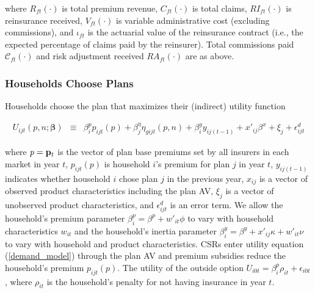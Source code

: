 \documentclass[12pt]{article}
\begin{document}
	\vspace{-0.1in}	

\noindent where $R_{ft}(\cdot)$ is total premium revenue, $C_{ft}(\cdot)$ is total claims, $RI_{ft}(\cdot)$ is reinsurance received, $V_{ft}(\cdot)$  is variable administrative cost (excluding commissions), and $\iota_{ft}$ is the actuarial value of the reinsurance contract (i.e., the expected percentage of claims paid by the reinsurer).  Total commissions paid $\mathcal{C}_{ft}(\cdot)$ and risk adjustment received  $RA_{ft}(\cdot)$ are as above.





\subsubsection{Households Choose Plans}


Households choose the plan that maximizes their (indirect) utility function

	\vspace{-0.4in}

	

	\begin{eqnarray}\label{demand_model}
	U_{ijt}(\textit{p},\textit{n};\boldsymbol{\beta}) &\equiv& \beta_{i}^p p_{ijt}(\textit{p}) + \beta_j^{\eta} \eta_{gijt}(\textit{p},\textit{n})   + \beta_i^y y_{ij(t-1)} + x'_{ij}\beta^x + \xi_{j} + \epsilon_{ijt}^d
	\end{eqnarray}
	
	\vspace{-0.1in}		
	

\noindent where $\textit{p} = {\bf p}_t$ is the vector of plan base premiums set by all insurers in each market in year $t$, $p_{ijt}(\textit{p})$ is household $i$'s premium for plan $j$ in year $t$, $y_{ij(t-1)}$ indicates whether household $i$ chose plan $j$ in the previous year, $x_{ij}$ is a vector of observed product characteristics including the plan AV,  $\xi_{j}$ is a vector of unobserved product characteristics, and $\epsilon_{ijt}^d$ is an error term.  We allow the household's premium parameter $\beta_{i}^p = \beta^p + w'_{it} \phi$ to vary with household characteristics $w_{it}$ and the household's inertia parameter $\beta_i^y = \beta^y +  x'_{ij} \kappa + w'_{it} \nu$ to vary with household and product characteristics. CSRs enter utility equation (\ref{demand_model}) through the plan AV and premium subsidies reduce the household's premium $p_{ijt}(\textit{p})$.   The utility of the outside option $U_{i0t} = \beta_i^p \rho_{it} + \epsilon_{i0t}$, where $\rho_{it}$ is the household's penalty for not having insurance in year $t$. 
\end{document}
